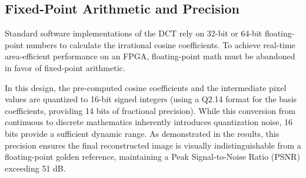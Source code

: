 \subsection{Fixed-Point Arithmetic and Precision}
Standard software implementations of the DCT rely on 32-bit or 64-bit floating-point numbers to calculate the irrational cosine coefficients. To achieve real-time area-efficient performance on an FPGA, floating-point math must be abandoned in favor of fixed-point arithmetic. 

In this design, the pre-computed cosine coefficients and the intermediate pixel values are quantized to 16-bit signed integers (using a Q2.14 format for the basis coefficients, providing 14 bits of fractional precision). While this conversion from continuous to discrete mathematics inherently introduces quantization noise, 16 bits provide a sufficient dynamic range. As demonstrated in the results, this precision ensures the final reconstructed image is visually indistinguishable from a floating-point golden reference, maintaining a Peak Signal-to-Noise Ratio (PSNR) exceeding 51 dB.
